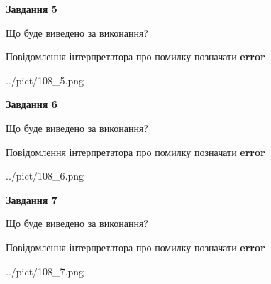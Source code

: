 \documentclass[10pt, ukrainian]{article}
\begin{document}
{\begin {large}
{\begin {center}\textbf{Завдання 5}\end {center}}\par
Що буде виведено за виконання? \par
Повідомлення інтерпретатора про помилку позначати \textbf{error}

\begin{center}
	{../pict/108_5.png}
\end{center}
\newpage

{\begin {center}\textbf{Завдання 6}\end {center}}\par
Що буде виведено за виконання? \par
Повідомлення інтерпретатора про помилку позначати \textbf{error}

\begin{center}
	{../pict/108_6.png}
\end{center}
\newpage

{\begin {center}\textbf{Завдання 7}\end {center}}\par
Що буде виведено за виконання? \par
Повідомлення інтерпретатора про помилку позначати \textbf{error}

\begin{center}
	{../pict/108_7.png}
\end{center}
\newpage

\end {large}}
\end{document}
